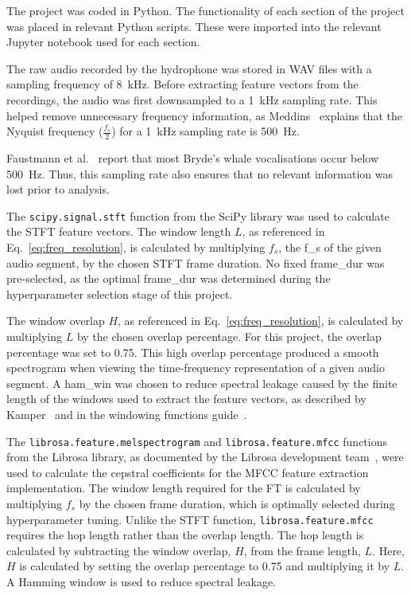 \label{chap:sys-design}

\label{sec:overview}
The project was coded in Python. The functionality of each section of the project was placed in relevant Python scripts. 
These were imported into the relevant Jupyter notebook used for each section.


\label{sec:feature-extraction-methods}
The raw audio recorded by the hydrophone was stored in \acs{WAV} files with a sampling frequency of 8~kHz. Before extracting feature 
vectors from the recordings, the audio was first downsampled to a 1~kHz sampling rate. This helped remove unnecessary frequency 
information, as Meddins~\cite{nyq} explains that the Nyquist frequency ($\frac{f_s}{2}$) for a 1~kHz sampling rate is 500~Hz.

Faustmann et al.~\cite{bryde_whales_SA} report that most Bryde's whale vocalisations occur below 500~Hz. Thus, this sampling rate also ensures 
that no relevant information was lost prior to analysis. 


\label{sec:stft}
The \texttt{scipy.signal.stft} function from the SciPy library was used to calculate the \ac{STFT} feature vectors. The window length $L$, as 
referenced in Eq.~\eqref{eq:freq_resolution}, is calculated by multiplying $f_s$, the \gls{f_s} of the given audio segment, by the chosen \acs{STFT} 
frame duration. No fixed \gls{frame_dur} was pre-selected, as the optimal \gls{frame_dur} was determined during the hyperparameter selection stage 
of this project.

The window overlap $H$, as referenced in Eq.~\eqref{eq:freq_resolution}, is calculated by multiplying $L$ by the chosen overlap percentage. For this 
project, the overlap percentage was set to 0.75. This high overlap percentage produced a smooth spectrogram when viewing the time-frequency 
representation of a given audio segment. A \gls{ham_win} was chosen to reduce spectral leakage caused by the finite length of the windows used 
to extract the feature vectors, as described by Kamper~\cite{stft_kamper} and in the windowing functions guide~\cite{hamm}.


\label{sec:mfcc}
The \texttt{librosa.feature.melspectrogram} and \texttt{librosa.feature.mfcc} functions from the Librosa library, as documented by the 
Librosa development team~\cite{mfcc_librosa}, were used to calculate the cepstral coefficients for the \ac{MFCC} feature extraction implementation. 
The window length required for the \ac{FT} is calculated by multiplying 
$f_s$ by the chosen frame duration, which is optimally selected during hyperparameter tuning. Unlike the \acs{STFT} function, \texttt{librosa.feature.mfcc} 
requires the hop length rather than the overlap length. The hop length is calculated by subtracting the window overlap, $H$, from the frame length, $L$. 
Here, $H$ is calculated by setting the overlap percentage to 0.75 and multiplying it by $L$. A Hamming window is used to reduce spectral leakage. 

